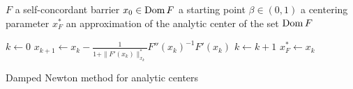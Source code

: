 \begin{algorithm}[ht]
  \begin{algorithmic}[1]
    \Require
      \Statex $F$ a self-concordant barrier
      \Statex $x_0 \in \operatorname{Dom} F$ a starting point
      \Statex $\beta \in (0,1)$ a centering parameter
    \Ensure
      \Statex $x^*_F$ an approximation of the analytic center of the set $\operatorname{Dom} F$
      \Statex

    \State $k \gets 0$
      \State $x_{k+1} \gets x_k - \frac{1}{1+\|F'(x_k)\|_{x_k}^*}F''(x_k)^{-1}F'(x_k)$
      \State $k \gets k + 1$
    \EndWhile
    \State \Return $x^*_F \gets x_k$

  \end{algorithmic}
  \caption{Damped Newton method for analytic centers}
\end{algorithm}
